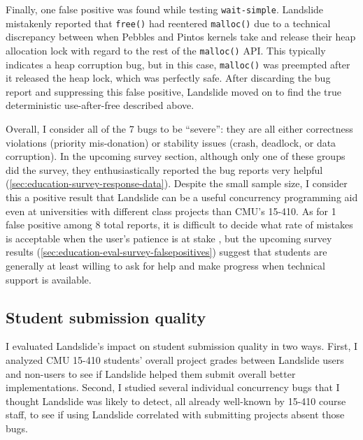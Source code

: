 
Finally, one false positive was found while testing {\tt wait-simple}.
Landslide mistakenly reported that {\tt free()} had reentered {\tt malloc()}
due to a technical discrepancy between when Pebbles and Pintos kernels take and release their heap allocation lock
with regard to the rest of the {\tt malloc()} API.
This typically indicates a heap corruption bug, but in this case,
{\tt malloc()} was preempted after it released the heap lock, which was perfectly safe.
After discarding the bug report and suppressing this false positive,
Landslide moved on to find the true deterministic use-after-free described above.

Overall, I consider all of the 7 bugs to be ``severe'':
they are all either correctness violations (priority mis-donation)
or stability issues (crash, deadlock, or data corruption).
In the upcoming survey section, although only one of these groups did the survey,
they enthusiastically reported 
the bug reports very helpful (\cref{sec:education-survey-response-data}).
Despite the small sample size, I consider this
a positive result that Landslide can be a useful concurrency programming aid
even at universities with different class projects than CMU's 15-410.
As for 1 false positive among 8 total reports,
it is difficult to decide what rate of mistakes is acceptable when the user's patience is at stake \cite{racerx},
but the upcoming survey results (\cref{sec:education-eval-survey-falsepositives})
suggest that students are generally at least willing
to ask for help and make progress when technical support is available.

\subsection{Student submission quality}
\label{sec:education-eval-grades}

I evaluated Landslide's impact on student submission quality in two ways.
First, I analyzed CMU 15-410 students' overall project grades between Landslide users and non-users
to see if Landslide  helped them submit overall better implementations.
Second, I studied
several %
individual concurrency bugs that I thought Landslide was likely to detect,
all already well-known by 15-410 course staff,
to see if using Landslide correlated with submitting projects absent those bugs.

